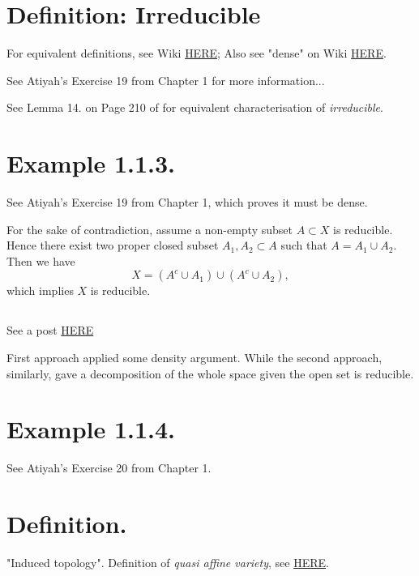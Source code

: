 
\section{Definition: Irreducible}

For equivalent definitions, see Wiki \href{https://en.wikipedia.org/wiki/Irreducible_component}{HERE};
Also see "dense" on Wiki \href{https://en.wikipedia.org/wiki/Dense_set}{HERE}.

See Atiyah's \cite{atiyah1994introduction} Exercise 19 from Chapter 1 for more information...

See Lemma 14. on Page 210 of \cite{bosch2013algebraic} for equivalent characterisation of \textit{irreducible}.

\section{Example 1.1.3.}
See Atiyah's \cite{atiyah1994introduction} Exercise 19 from Chapter 1, which proves it must be dense.

For the sake of contradiction, assume a non-empty subset $A\subset X$ is reducible. Hence there exist two proper closed subset $A_1,A_2\subset A$ such that $A=A_1\cup A_2$.
Then we have $$X=(A^c\cup A_1)\cup (A^c\cup A_2),$$ which implies $X$ is reducible. 
\subsection{}
See a post \href{https://math.stackexchange.com/questions/460074/an-open-subset-of-an-irreducible-set-is-dense}{HERE} 

First approach applied some density argument. While the second approach, similarly, gave a decomposition of the whole space given the open set is reducible.

\section{Example 1.1.4.}

See Atiyah's \cite{atiyah1994introduction} Exercise 20 from Chapter 1.

\section{Definition.} 
"Induced topology". Definition of \textit{quasi affine variety}, see \href{https://math.stackexchange.com/questions/1086839/a-confusion-regarding-the-definition-of-a-quasi-affine-variety}{HERE}.

